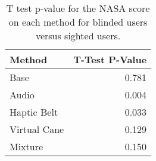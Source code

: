 
\begin{table}[!htb]
\centering
\caption{T test p-value for the NASA score on each method for blinded users versus sighted users.}
\label{tab:ttest_nasa_score}
\begin{tabular}{lr}
\toprule
      Method &  T-Test P-Value \\
\midrule
        Base &           0.781 \\
       Audio &           0.004 \\
 Haptic Belt &           0.033 \\
Virtual Cane &           0.129 \\
     Mixture &           0.150 \\
\bottomrule
\end{tabular}
\end{table}

